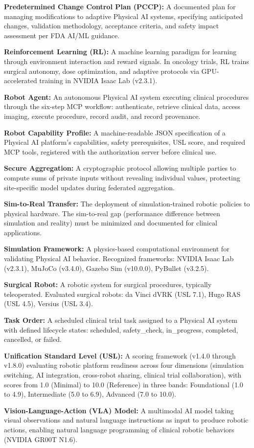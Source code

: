 \documentclass[11pt]{article}
\begin{document}
\textbf{Predetermined Change Control Plan (PCCP):} A documented plan for managing modifications to adaptive Physical AI systems, specifying anticipated changes, validation methodology, acceptance criteria, and safety impact assessment per FDA AI/ML guidance.

\textbf{Reinforcement Learning (RL):} A machine learning paradigm for learning through environment interaction and reward signals. In oncology trials, RL trains surgical autonomy, dose optimization, and adaptive protocols via GPU-accelerated training in NVIDIA Isaac Lab (v2.3.1).

\textbf{Robot Agent:} An autonomous Physical AI system executing clinical procedures through the six-step MCP workflow: authenticate, retrieve clinical data, access imaging, execute procedure, record audit, and record provenance.

\textbf{Robot Capability Profile:} A machine-readable JSON specification of a Physical AI platform's capabilities, safety prerequisites, USL score, and required MCP tools, registered with the authorization server before clinical use.

\textbf{Secure Aggregation:} A cryptographic protocol allowing multiple parties to compute sums of private inputs without revealing individual values, protecting site-specific model updates during federated aggregation.

\textbf{Sim-to-Real Transfer:} The deployment of simulation-trained robotic policies to physical hardware. The sim-to-real gap (performance difference between simulation and reality) must be minimized and documented for clinical applications.

\textbf{Simulation Framework:} A physics-based computational environment for validating Physical AI behavior. Recognized frameworks: NVIDIA Isaac Lab (v2.3.1), MuJoCo (v3.4.0), Gazebo Sim (v10.0.0), PyBullet (v3.2.5).

\textbf{Surgical Robot:} A robotic system for surgical procedures, typically teleoperated. Evaluated surgical robots: da Vinci dVRK (USL 7.1), Hugo RAS (USL 4.5), Versius (USL 3.4).

\textbf{Task Order:} A scheduled clinical trial task assigned to a Physical AI system with defined lifecycle states: scheduled, safety\_check, in\_progress, completed, cancelled, or failed.

\textbf{Unification Standard Level (USL):} A scoring framework (v1.4.0 through v1.8.0) evaluating robotic platform readiness across four dimensions (simulation switching, AI integration, cross-robot sharing, clinical trial collaboration), with scores from 1.0 (Minimal) to 10.0 (Reference) in three bands: Foundational (1.0 to 4.9), Intermediate (5.0 to 6.9), Advanced (7.0 to 10.0).

\textbf{Vision-Language-Action (VLA) Model:} A multimodal AI model taking visual observations and natural language instructions as input to produce robotic actions, enabling natural language programming of clinical robotic behaviors (NVIDIA GR00T N1.6).

\clearpage
\nocite{cfr-part-50}
\printbibliography[title={Bibliography}]
\end{document}
